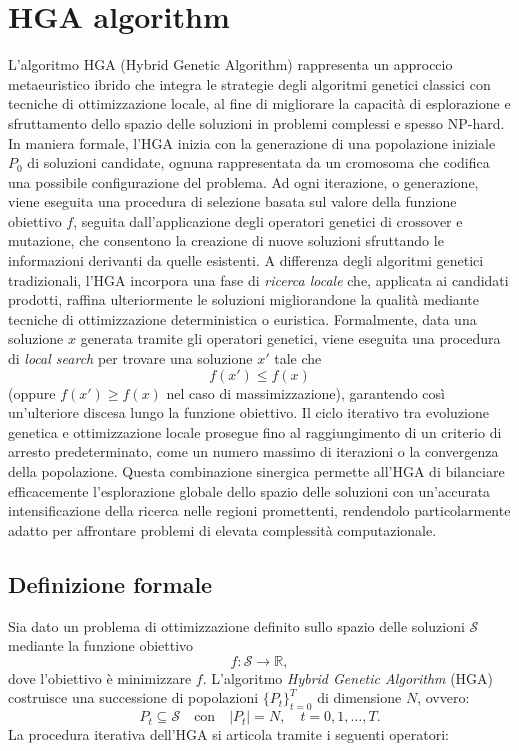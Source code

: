\documentclass[12pt,a4paper,twoside]{article}
\begin{document}
\section{HGA algorithm}
L'algoritmo HGA (Hybrid Genetic Algorithm) rappresenta un approccio metaeuristico ibrido che integra le strategie degli algoritmi genetici classici con tecniche di ottimizzazione locale, al fine di migliorare la capacità di esplorazione e sfruttamento dello spazio delle soluzioni in problemi complessi e spesso NP-hard. In maniera formale, l'HGA inizia con la generazione di una popolazione iniziale \( P_0 \) di soluzioni candidate, ognuna rappresentata da un cromosoma che codifica una possibile configurazione del problema. Ad ogni iterazione, o generazione, viene eseguita una procedura di selezione basata sul valore della funzione obiettivo \( f \), seguita dall'applicazione degli operatori genetici di crossover e mutazione, che consentono la creazione di nuove soluzioni sfruttando le informazioni derivanti da quelle esistenti. A differenza degli algoritmi genetici tradizionali, l'HGA incorpora una fase di \emph{ricerca locale} che, applicata ai candidati prodotti, raffina ulteriormente le soluzioni migliorandone la qualità mediante tecniche di ottimizzazione deterministica o euristica. Formalmente, data una soluzione \( x \) generata tramite gli operatori genetici, viene eseguita una procedura di \emph{local search} per trovare una soluzione \( x' \) tale che
\[
f(x') \leq f(x)
\]
(oppure \( f(x') \geq f(x) \) nel caso di massimizzazione), garantendo così un'ulteriore discesa lungo la funzione obiettivo. Il ciclo iterativo tra evoluzione genetica e ottimizzazione locale prosegue fino al raggiungimento di un criterio di arresto predeterminato, come un numero massimo di iterazioni o la convergenza della popolazione. Questa combinazione sinergica permette all'HGA di bilanciare efficacemente l’esplorazione globale dello spazio delle soluzioni con un’accurata intensificazione della ricerca nelle regioni promettenti, rendendolo particolarmente adatto per affrontare problemi di elevata complessità computazionale.
\subsection{Definizione formale}
Sia dato un problema di ottimizzazione definito sullo spazio delle soluzioni \(\mathcal{S}\) mediante la funzione obiettivo
\[
f:\mathcal{S}\to\mathbb{R},
\]
dove l'obiettivo è minimizzare \(f\). L'algoritmo \emph{Hybrid Genetic Algorithm} (HGA) costruisce una successione di popolazioni \(\{P_t\}_{t=0}^T\) di dimensione \(N\), ovvero:
\[
P_t \subseteq \mathcal{S} \quad \text{con} \quad |P_t| = N,\quad t=0,1,\dots,T.
\]
La procedura iterativa dell'HGA si articola tramite i seguenti operatori:
\end{document}
